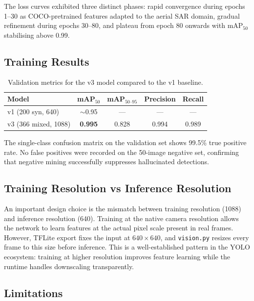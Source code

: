 \documentclass[10pt,a4paper]{article}
\begin{document}
The loss curves exhibited three distinct phases: rapid convergence during epochs 1--30 as COCO-pretrained features adapted to the aerial SAR domain, gradual refinement during epochs 30--80, and plateau from epoch 80 onwards with mAP$_{50}$ stabilising above 0.99.

\subsection{Training Results}

\begin{table}[ht]
  \centering
  \caption{Validation metrics for the v3 model compared to the v1 baseline.}\label{tab:training-results}
  \begin{tabular}{@{}lcccc@{}}
    \toprule
    \textbf{Model} & \textbf{mAP$_{50}$} & \textbf{mAP$_{50\text{--}95}$} & \textbf{Precision} & \textbf{Recall} \\
    \midrule
    v1 (200 syn, 640) & ${\sim}$0.95 & --- & --- & --- \\
    v3 (366 mixed, 1088) & \textbf{0.995} & 0.828 & 0.994 & 0.989 \\
    \bottomrule
  \end{tabular}
\end{table}

The single-class confusion matrix on the validation set shows 99.5\% true positive rate. No false positives were recorded on the 50-image negative set, confirming that negative mining successfully suppresses hallucinated detections.

\subsection{Training Resolution vs Inference Resolution}

An important design choice is the mismatch between training resolution (1088) and inference resolution (640). Training at the native camera resolution allows the network to learn features at the actual pixel scale present in real frames. However, TFLite export fixes the input at $640 \times 640$, and \texttt{vision.py} resizes every frame to this size before inference. This is a well-established pattern in the YOLO ecosystem: training at higher resolution improves feature learning while the runtime handles downscaling transparently.

\subsection{Limitations}
\end{document}
